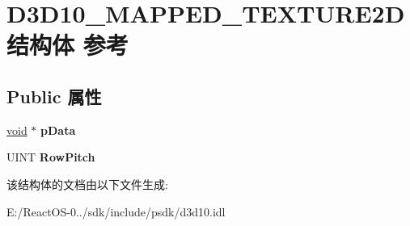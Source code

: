 \hypertarget{struct_d3_d10___m_a_p_p_e_d___t_e_x_t_u_r_e2_d}{}\section{D3\+D10\+\_\+\+M\+A\+P\+P\+E\+D\+\_\+\+T\+E\+X\+T\+U\+R\+E2\+D结构体 参考}
\label{struct_d3_d10___m_a_p_p_e_d___t_e_x_t_u_r_e2_d}
\subsection*{Public 属性}
\begin{DoxyCompactItemize}
\item 
\mbox{\label{struct_d3_d10___m_a_p_p_e_d___t_e_x_t_u_r_e2_d_a6479d029750e64606b0225d0b65024f4}} 
\hyperlink{interfacevoid}{void} $\ast$ {\bfseries p\+Data}
\item 
\mbox{\label{struct_d3_d10___m_a_p_p_e_d___t_e_x_t_u_r_e2_d_a9bc56c32b98ef277e06a3c6d749040c3}} 
U\+I\+NT {\bfseries Row\+Pitch}
\end{DoxyCompactItemize}


该结构体的文档由以下文件生成\+:\begin{DoxyCompactItemize}
\item 
E\+:/\+React\+O\+S-\/0../sdk/include/psdk/d3d10.\+idl\end{DoxyCompactItemize}
